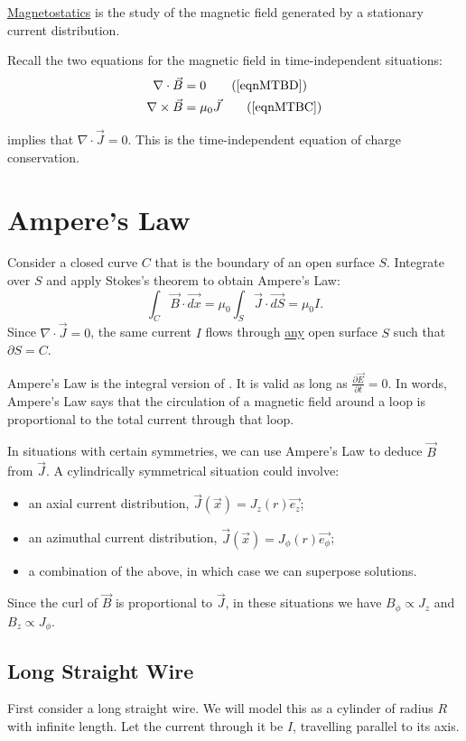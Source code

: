 \documentclass[../Main.tex]{subfiles}
\begin{document}
\underline{Magnetostatics} is the study of the magnetic field generated by a stationary current distribution.

Recall the two equations for the magnetic field in time-independent situations:
\begin{align*}
    \nabla \cdot \vec{B} &= 0 \tag{\ref{eqnMTBD}} \\
    \nabla \times \vec{B} &= \mu_0 \vec{J} \tag{\ref{eqnMTBC}}
\end{align*}

 implies that $\nabla \cdot \vec{J} = 0$. This is the time-independent equation of charge conservation.

\section{Ampere's Law}
Consider a closed curve $C$ that is the boundary of an open surface $S$. Integrate  over $S$ and apply Stokes's theorem to obtain Ampere's Law:
\begin{equation}
    \int_C \vec{B} \cdot \vec{dx} = \mu_0 \int_S \vec{J} \cdot \vec{dS} = \mu_0 I.
    \label{eqnAmpere}
\end{equation}
Since $\nabla \cdot \vec{J} = 0$, the same current $I$ flows through \underline{any} open surface $S$ such that $\partial S = C$.

Ampere's Law is the integral version of . It is valid as long as $\frac{\partial \vec{E}}{\partial t} = 0$. In words, Ampere's Law says that the circulation of a magnetic field around a loop is proportional to the total current through that loop.

In situations with certain symmetries, we can use Ampere's Law to deduce $\vec{B}$ from $\vec{J}$.
A cylindrically symmetrical situation could involve:
\begin{itemize}
    \item an axial current distribution, $\vec{J}(\vec{x}) = J_z(r) \vec{e_z}$;
    \item an azimuthal current distribution, $\vec{J}(\vec{x}) = J_\phi(r) \vec{e_\phi}$;
    \item a combination of the above, in which case we can superpose solutions.
\end{itemize}
Since the curl of $\vec{B}$ is proportional to $\vec{J}$, in these situations we have $B_\phi \propto J_z$ and $B_z \propto J_\phi$.
\subsection{Long Straight Wire}
First consider a long straight wire. We will model this as a cylinder of radius $R$ with infinite length. Let the current through it be $I$, travelling parallel to its axis.
\end{document}

